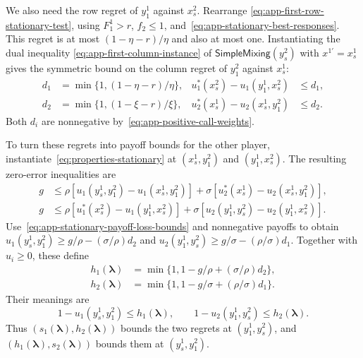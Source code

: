 \documentclass[11pt]{article}
\theoremstyle{remark}
\theoremstyle{plain}
\newcommand{\sm}{\mathsf{SimpleMixing}}
\begin{document}
We also need the row regret of $y_1^1$ against $x_s^2$. Rearrange
\eqref{eq:app-first-row-stationary-test}, using $F_1^1>r$,
$f_2\le1$, and~\eqref{eq:app-stationary-best-responses}.
This regret is at most $(1-\eta-r)/\eta$ and also at most one.
Instantiating the dual inequality
\eqref{eq:app-first-column-instance} of $\sm(y_s^2)$ with
$x^{1\prime}=x_s^1$ gives the symmetric bound on the column regret
of $y_1^2$ against $x_s^1$:
\begin{equation}
 \begin{aligned}
 d_1&=\min\{1,(1-\eta-r)/\eta\},&
 u_1^*(x_s^2)-u_1(y_1^1,x_s^2)&\le d_1,\\
 d_2&=\min\{1,(1-\xi-r)/\xi\},&
 u_2^*(x_s^1)-u_2(x_s^1,y_1^2)&\le d_2.
 \end{aligned}
 \label{eq:app-stationary-payoff-loss-bounds}
\end{equation}
Both $d_i$ are nonnegative by~\eqref{eq:app-positive-call-weights}.

To turn these regrets into payoff bounds for the other player,
instantiate~\eqref{eq:properties-stationary} at
$(x_s^1,y_1^2)$ and $(y_1^1,x_s^2)$. The resulting zero-error
inequalities are
\begin{equation}
 \begin{aligned}
 g&\le\rho[u_1(y_s^1,y_1^2)-u_1(x_s^1,y_1^2)]
              +\sigma[u_2^*(x_s^1)-u_2(x_s^1,y_1^2)],\\
 g&\le\rho[u_1^*(x_s^2)-u_1(y_1^1,x_s^2)]
              +\sigma[u_2(y_1^1,y_s^2)-u_2(y_1^1,x_s^2)].
 \end{aligned}
 \label{eq:app-cross-stationary-tests}
\end{equation}
Use~\eqref{eq:app-stationary-payoff-loss-bounds} and nonnegative
payoffs to obtain $u_1(y_s^1,y_1^2)\ge g/\rho-(\sigma/\rho)d_2$
and $u_2(y_1^1,y_s^2)\ge g/\sigma-(\rho/\sigma)d_1$.
Together with $u_i\ge0$, these define
\begin{equation}
 \begin{aligned}
 h_1(\boldsymbol\lambda)&=\min\{1,1-g/\rho+(\sigma/\rho)d_2\},\\
 h_2(\boldsymbol\lambda)&=\min\{1,1-g/\sigma+(\rho/\sigma)d_1\}.
 \end{aligned}
 \label{eq:payoff-bound-h}
\end{equation}
Their meanings are
\begin{equation}
 1-u_1(y_s^1,y_1^2)\le h_1(\boldsymbol\lambda),\qquad
 1-u_2(y_1^1,y_s^2)\le h_2(\boldsymbol\lambda).
 \label{eq:app-payoff-bound-h-meaning}
\end{equation}
Thus $(s_1(\boldsymbol\lambda),h_2(\boldsymbol\lambda))$ bounds the two regrets at $(y_1^1,y_s^2)$,
and $(h_1(\boldsymbol\lambda),s_2(\boldsymbol\lambda))$ bounds them at $(y_s^1,y_1^2)$.
\end{document}
